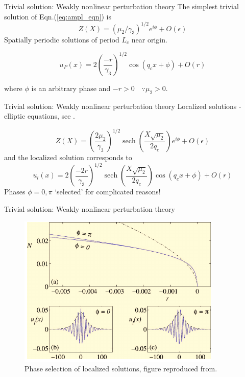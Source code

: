 \documentclass{beamer}
\DeclareMathOperator{\sech}{sech}
\begin{document}
\begin{frame}{Trivial solution: Weakly nonlinear perturbation theory}
The simplest trivial solution of Eqn.(\ref{eq:ampl_eqn}) is 
\begin{equation}\label{eq:ampl_eqn_soln}
 Z(X) =(\mu_{2}/\gamma_{3})^{1/2} e^{i\phi} + O(\epsilon)
\end{equation}
Spatially periodic solutions of period $L_{c}$ near origin. 

\begin{equation}\label{eq:periodic_states}
 u_{P}(x) = 2 \left(\frac{-r}{\gamma_{3}}\right)^{1/2} \cos{(q_{c}x + \phi)} + O(r) 
\end{equation}

where $\phi$ is an arbitrary phase and $-r > 0 \quad \because \mu_{2} > 0$. 

\end{frame}
\begin{frame}{Trivial solution: Weakly nonlinear perturbation theory}
Localized solutions - elliptic equations, see \cite{burke2007snakes}. 

\begin{equation}\label{eq:localized_amp}
 Z(X) = \left(\frac{2\mu_{2}}{\gamma_{3}}\right)^{1/2}\sech{\left( \frac{X\sqrt{\mu_{2}}}{2q_{c}}\right)}e^{i\phi} + O(\epsilon)
\end{equation}
and the localized solution corresponds to 
\begin{equation}
 u_{l}(x) = 2 \left(\frac{-2r}{\gamma_{3}}\right)^{1/2}\sech{\left( \frac{X\sqrt{\mu_{2}}}{2q_{c}}\right)}\cos{(q_{c}x + \phi)} + O(r) 
\end{equation}
Phases $\phi = 0, \pi$ `selected' for complicated reasons!
\end{frame}
\begin{frame}{Trivial solution: Weakly nonlinear perturbation theory}
\begin{figure}[ht]
  \centering
  \includegraphics[scale=0.8]
  {Figs/localized_soln_phases.png}  
  \caption{Phase selection of localized solutions, figure reproduced from\cite{burke2007snakes}.}
  \label{fig:localized_soln_phases}
\end{figure}

\end{frame}
\end{document}
